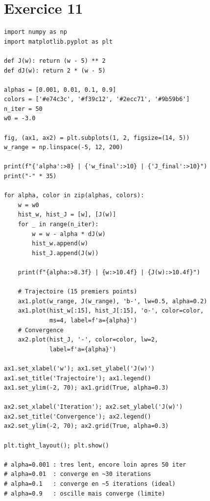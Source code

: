 \section*{Exercice 11 \hfill \exoavance}

\separateur

\begin{pythonbox}
\begin{lstlisting}
import numpy as np
import matplotlib.pyplot as plt

def J(w): return (w - 5) ** 2
def dJ(w): return 2 * (w - 5)

alphas = [0.001, 0.01, 0.1, 0.9]
colors = ['#e74c3c', '#f39c12', '#2ecc71', '#9b59b6']
n_iter = 50
w0 = -3.0

fig, (ax1, ax2) = plt.subplots(1, 2, figsize=(14, 5))
w_range = np.linspace(-5, 12, 200)

print(f"{'alpha':>8} | {'w_final':>10} | {'J_final':>10}")
print("-" * 35)

for alpha, color in zip(alphas, colors):
    w = w0
    hist_w, hist_J = [w], [J(w)]
    for _ in range(n_iter):
        w = w - alpha * dJ(w)
        hist_w.append(w)
        hist_J.append(J(w))

    print(f"{alpha:>8.3f} | {w:>10.4f} | {J(w):>10.4f}")

    # Trajectoire (15 premiers points)
    ax1.plot(w_range, J(w_range), 'b-', lw=0.5, alpha=0.2)
    ax1.plot(hist_w[:15], hist_J[:15], 'o-', color=color,
             ms=4, label=f'a={alpha}')
    # Convergence
    ax2.plot(hist_J, '-', color=color, lw=2,
             label=f'a={alpha}')

ax1.set_xlabel('w'); ax1.set_ylabel('J(w)')
ax1.set_title('Trajectoire'); ax1.legend()
ax1.set_ylim(-2, 70); ax1.grid(True, alpha=0.3)

ax2.set_xlabel('Iteration'); ax2.set_ylabel('J(w)')
ax2.set_title('Convergence'); ax2.legend()
ax2.set_ylim(-2, 70); ax2.grid(True, alpha=0.3)

plt.tight_layout(); plt.show()

# alpha=0.001 : tres lent, encore loin apres 50 iter
# alpha=0.01  : converge en ~30 iterations
# alpha=0.1   : converge en ~5 iterations (ideal)
# alpha=0.9   : oscille mais converge (limite)
\end{lstlisting}
\end{pythonbox}

